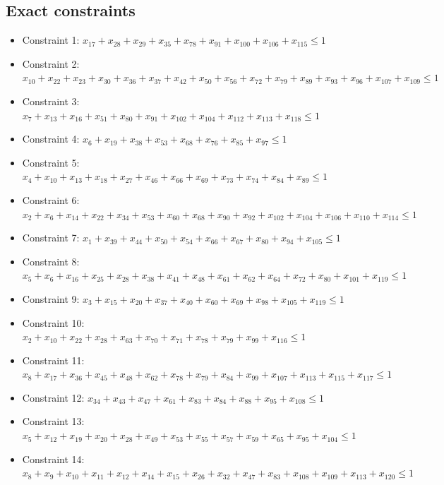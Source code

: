 \documentclass[11pt]{article}
\begin{document}
\subsection*{Exact constraints}
\begin{itemize}
\item Constraint 1: $x_{17} + x_{28} + x_{29} + x_{35} + x_{78} + x_{91} + x_{100} + x_{106} + x_{115} \le 1$
\item Constraint 2: $x_{10} + x_{22} + x_{23} + x_{30} + x_{36} + x_{37} + x_{42} + x_{50} + x_{56} + x_{72} + x_{79} + x_{89} + x_{93} + x_{96} + x_{107} + x_{109} \le 1$
\item Constraint 3: $x_{7} + x_{13} + x_{16} + x_{51} + x_{80} + x_{91} + x_{102} + x_{104} + x_{112} + x_{113} + x_{118} \le 1$
\item Constraint 4: $x_{6} + x_{19} + x_{38} + x_{53} + x_{68} + x_{76} + x_{85} + x_{97} \le 1$
\item Constraint 5: $x_{4} + x_{10} + x_{13} + x_{18} + x_{27} + x_{46} + x_{66} + x_{69} + x_{73} + x_{74} + x_{84} + x_{89} \le 1$
\item Constraint 6: $x_{2} + x_{6} + x_{14} + x_{22} + x_{34} + x_{53} + x_{60} + x_{68} + x_{90} + x_{92} + x_{102} + x_{104} + x_{106} + x_{110} + x_{114} \le 1$
\item Constraint 7: $x_{1} + x_{39} + x_{44} + x_{50} + x_{54} + x_{66} + x_{67} + x_{80} + x_{94} + x_{105} \le 1$
\item Constraint 8: $x_{5} + x_{6} + x_{16} + x_{25} + x_{28} + x_{38} + x_{41} + x_{48} + x_{61} + x_{62} + x_{64} + x_{72} + x_{80} + x_{101} + x_{119} \le 1$
\item Constraint 9: $x_{3} + x_{15} + x_{20} + x_{37} + x_{40} + x_{60} + x_{69} + x_{98} + x_{105} + x_{119} \le 1$
\item Constraint 10: $x_{2} + x_{10} + x_{22} + x_{28} + x_{63} + x_{70} + x_{71} + x_{78} + x_{79} + x_{99} + x_{116} \le 1$
\item Constraint 11: $x_{8} + x_{17} + x_{36} + x_{45} + x_{48} + x_{62} + x_{78} + x_{79} + x_{84} + x_{99} + x_{107} + x_{113} + x_{115} + x_{117} \le 1$
\item Constraint 12: $x_{34} + x_{43} + x_{47} + x_{61} + x_{83} + x_{84} + x_{88} + x_{95} + x_{108} \le 1$
\item Constraint 13: $x_{5} + x_{12} + x_{19} + x_{20} + x_{28} + x_{49} + x_{53} + x_{55} + x_{57} + x_{59} + x_{65} + x_{95} + x_{104} \le 1$
\item Constraint 14: $x_{8} + x_{9} + x_{10} + x_{11} + x_{12} + x_{14} + x_{15} + x_{26} + x_{32} + x_{47} + x_{83} + x_{108} + x_{109} + x_{113} + x_{120} \le 1$

\end{itemize}
\end{document}

